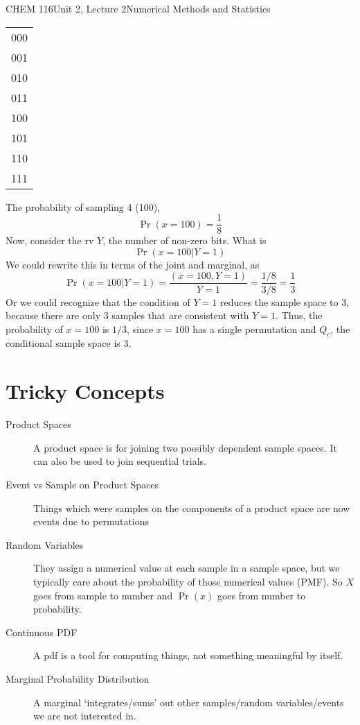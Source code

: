 \documentclass{article}
\begin{document}
\begin{tdoc}{CHEM 116}{Unit 2, Lecture 2}{Numerical Methods and Statistics}
\begin{tabular}{l}
000\\
001\\
010\\
011\\
100\\
101\\
110\\
111\\
\end{tabular}\vspace{0.25cm}

The probability of sampling 4 (100),
\[
\Pr(x = 100) = \frac{1}{8}
\]
Now, consider the rv $Y$, the number of non-zero bits. What is
\[
\Pr(x = 100 | Y = 1)
\]
We could rewrite this in terms of the joint and marginal, as
\[
\Pr(x = 100 | Y = 1) = \frac{(x = 100, Y = 1)}{Y = 1} = \frac{1 / 8}{3 / 8} = \frac{1}{3}
\]
Or we could recognize that the condition of $Y = 1$ reduces the sample
space to 3, because there are only 3 samples that are consistent with
$Y = 1$. Thus, the probability of $x = 100$ is $1/3$, since $x = 100$
has a single permutation and $Q_c$, the conditional sample space is
$3$.

\section{Tricky Concepts}

\begin{description}

\item[Product Spaces] A product space is for joining two possibly
  dependent sample spaces. It can also be used to join sequential trials.

\item[Event vs Sample on Product Spaces] Things which were samples on
  the components of a product space are now events due to permutations

\item[Random Variables] They assign a numerical value at each sample
  in a sample space, but we typically care about the probability of
  those numerical values (PMF). So $X$ goes from sample to number and
  $\Pr(x)$ goes from number to probability.

\item[Continuous PDF] A pdf is a tool for computing things, not
  something meaningful by itself.

\item[Marginal Probability Distribution] A marginal `integrates/sums'
  out other samples/random variables/events we are not interested in.


\end{description}
\end{tdoc}
\end{document}
